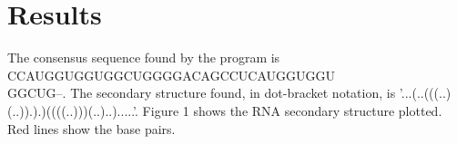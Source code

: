 \documentclass{acm_proc_article-sp}
\begin{document}
\section{Results}
The consensus sequence found by the program is \\ CCAUGGUGGUGGCUGGGGACAGCCUCAUGGUGGU\\GGCUG--.  The secondary structure found, in dot-bracket notation, is '...(..(((..)(..)).).)((((..)))(..)..).....'.  Figure 1 shows the RNA secondary structure plotted.  Red lines show the base pairs.  




%


%
%

\balancecolumns
\end{document}
